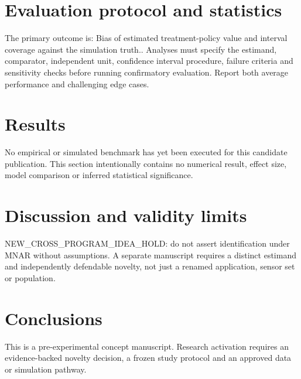\documentclass[11pt,a4paper]{article}
\begin{document}
\section{Evaluation protocol and statistics}
The primary outcome is: Bias of estimated treatment-policy value and interval coverage against the simulation truth.. Analyses must specify the estimand, comparator, independent unit, confidence interval procedure, failure criteria and sensitivity checks before running confirmatory evaluation. Report both average performance and challenging edge cases.
\section{Results}
No empirical or simulated benchmark has yet been executed for this candidate publication. This section intentionally contains no numerical result, effect size, model comparison or inferred statistical significance.
\section{Discussion and validity limits}
NEW\_CROSS\_PROGRAM\_IDEA\_HOLD: do not assert identification under MNAR without assumptions. A separate manuscript requires a distinct estimand and independently defendable novelty, not just a renamed application, sensor set or population.
\section{Conclusions}
This is a pre-experimental concept manuscript. Research activation requires an evidence-backed novelty decision, a frozen study protocol and an approved data or simulation pathway.
\end{document}
